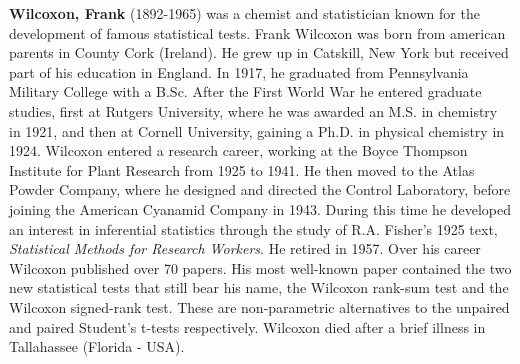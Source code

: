 \textbf{Wilcoxon, Frank} (1892-1965) was a chemist and statistician known for the development of famous statistical tests. Frank Wilcoxon was born from american parents in County Cork (Ireland). He grew up in Catskill, New York but received part of his education in England. In 1917, he graduated from Pennsylvania Military College with a B.Sc. After the First World War he entered graduate studies, first at Rutgers University, where he was awarded an M.S. in chemistry in 1921, and then at Cornell University, gaining a Ph.D. in physical chemistry in 1924. Wilcoxon entered a research career, working at the Boyce Thompson Institute for Plant Research from 1925 to 1941. He then moved to the Atlas Powder Company, where he designed and directed the Control Laboratory, before joining the American Cyanamid Company in 1943. During this time he developed an interest in inferential statistics through the study of R.A. Fisher's 1925 text, \textit{Statistical Methods for Research Workers}. He retired in 1957. Over his career Wilcoxon published over 70 papers. His most well-known paper contained the two new statistical tests that still bear his name, the Wilcoxon rank-sum test and the Wilcoxon signed-rank test. These are non-parametric alternatives to the unpaired and paired Student's t-tests respectively. Wilcoxon died after a brief illness in Tallahassee (Florida - USA).

